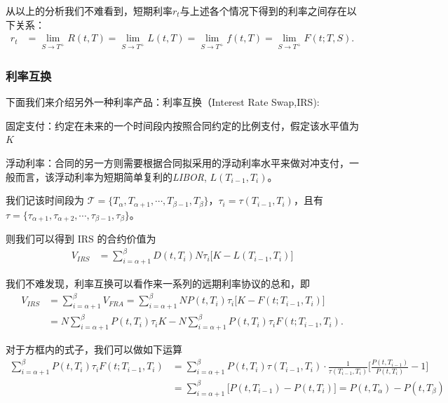 从以上的分析我们不难看到，短期利率$r_t$与上述各个情况下得到的利率之间存在以下关系：
\begin{align}
 r_t &= \lim_{S\rightarrow T^+} R(t, T)  
      = \lim_{S\rightarrow T^+} L(t, T)  
      = \lim_{S\rightarrow T^+} f(t, T)  
      = \lim_{S\rightarrow T^+} F(t; T, S).   \label{short}
\end{align}

\subsubsection{利率互换}

下面我们来介绍另外一种利率产品：利率互换（Interest Rate Swap,IRS):
\begin{compactitem}
 \item  固定支付：约定在未来的一个时间段内按照合同约定的比例支付，假定该水平值为 $K$
 \item  浮动利率：合同的另一方则需要根据合同拟采用的浮动利率水平来做对冲支付，一般而言，该浮动利率为短期简单复利的\emph{LIBOR}, $L(T_{i-1}, T_{i})$。
\end{compactitem}

我们记该时间段为 $\mathcal{T} = \{ T_{\alpha}, T_{\alpha+1},\cdots,T_{\beta - 1}, T_{\beta}\}$，$\tau_{i} = \tau(T_{i-1}, T_{i})$，且有$\mathcal{\tau} = \{ \tau_{\alpha + 1}, \tau_{\alpha+2},\cdots,\tau_{\beta - 1}, \tau_{\beta}\}$。

则我们可以得到 IRS 的合约价值为
\begin{align}
 V_{IRS} &= \sum_{i=\alpha+1}^{\beta} D(t,T_i) N \tau_i \bigg[ K - L(T_{i-1}, T_{i}) \bigg] \label{value-irs}
\end{align}

我们不难发现，利率互换可以看作来一系列的远期利率协议的总和，即
\begin{align*}
  V_{IRS} &= \sum_{i=\alpha+1}^{\beta} V_{FRA}  = \sum_{i=\alpha+1}^{\beta} N P(t, T_i) \tau_i \big[ K- F(t;T_{i-1},T_{i}) \big] \\
  &= N \sum_{i=\alpha+1}^{\beta}  P(t, T_i) \tau_i  K - N \boxed{ \sum_{i=\alpha+1}^{\beta} P(t, T_i) \tau_i F(t;T_{i-1},T_{i}) }.
\end{align*}

对于方框内的式子，我们可以做如下运算
\begin{align*}
\boxed{ \sum_{i=\alpha+1}^{\beta}  P(t, T_i) \tau_i F(t;T_{i-1},T_{i})   }
 &=\sum_{i=\alpha+1}^{\beta}  P(t, T_i) \tau(T_{i-1},T_{i}) \cdot \frac{1}{\tau(T_{i-1},T_{i})} \bigg[ \frac{P(t,T_{i-1})}{P(t,T_{i})} - 1 \bigg] \\
 &=\sum_{i=\alpha+1}^{\beta} \bigg[ P(t,T_{i-1}) - P(t,T_{i}) \bigg]  = P(t,T_{\alpha}) - P(t,T_{\beta})
\end{align*}

